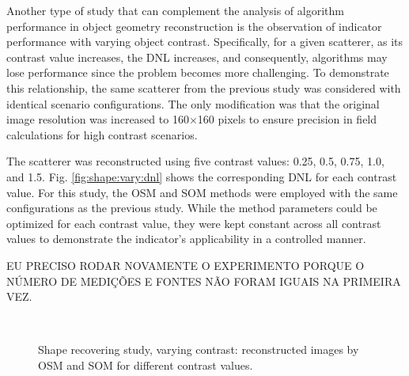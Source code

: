 \documentclass{IEEEtran}
\begin{document}
                Another type of study that can complement the analysis of algorithm performance in object geometry reconstruction is the observation of indicator performance with varying object contrast. Specifically, for a given scatterer, as its contrast value increases, the DNL increases, and consequently, algorithms may lose performance since the problem becomes more challenging. To demonstrate this relationship, the same scatterer from the previous study was considered with identical scenario configurations. The only modification was that the original image resolution was increased to 160$\times$160 pixels to ensure precision in field calculations for high contrast scenarios. 

                The scatterer was reconstructed using five contrast values: 0.25, 0.5, 0.75, 1.0, and 1.5. Fig. \ref{fig:shape:vary:dnl} shows the corresponding DNL for each contrast value. For this study, the OSM and SOM methods were employed with the same configurations as the previous study. While the method parameters could be optimized for each contrast value, they were kept constant across all contrast values to demonstrate the indicator's applicability in a controlled manner.

                {\color{red} EU PRECISO RODAR NOVAMENTE O EXPERIMENTO PORQUE O NÚMERO DE MEDIÇÕES E FONTES NÃO FORAM IGUAIS NA PRIMEIRA VEZ.}

                \begin{figure}[!htb]
                    \centering
                     \\
                    \caption{Shape recovering study, varying contrast: reconstructed images by OSM and SOM for different contrast values.}
                    \label{fig:shape:vary:recons}
                \end{figure}
                
\end{document}
